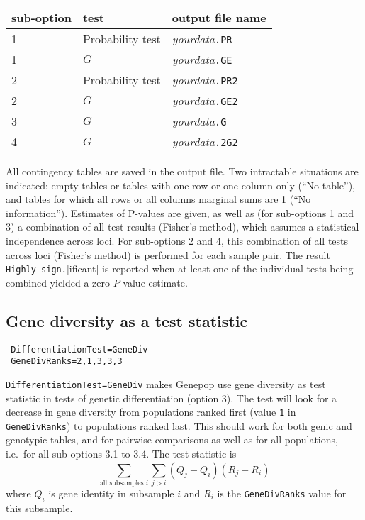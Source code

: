 \documentclass[12pt,]{book}
\begin{document}
\begin{longtable}[]{@{}lll@{}}
\toprule
sub-option & test & output file name\tabularnewline
\midrule
\endhead
1 & Probability test & \emph{yourdata}\texttt{.PR}\tabularnewline
1 & \(G\) & \emph{yourdata}\texttt{.GE}\tabularnewline
2 & Probability test & \emph{yourdata}\texttt{.PR2}\tabularnewline
2 & \(G\) & \emph{yourdata}\texttt{.GE2}\tabularnewline
3 & \(G\) & \emph{yourdata}\texttt{.G}\tabularnewline
4 & \(G\) & \emph{yourdata}\texttt{.2G2}\tabularnewline
\bottomrule
\end{longtable}

All contingency tables are saved in the output file. Two intractable
situations are indicated: empty tables or tables with one row or one
column only (``No table''), and tables for which all rows or all columns
marginal sums are 1 (``No information''). Estimates of P-values are
given, as well as (for sub-options 1 and 3) a combination of all test
results (Fisher's method), which assumes a statistical independence
across loci. For sub-options 2 and 4, this combination of all tests
across loci (Fisher's method) is performed for each sample pair. The
result \texttt{Highly\ sign.}{[}ificant{]} is reported when at least one
of the individual tests being combined yielded a zero \(P\)-value
estimate.

\subsection{Gene diversity as a test
statistic}\label{gene-diversity-as-a-test-statistic}


\begin{verbatim}
 DifferentiationTest=GeneDiv
 GeneDivRanks=2,1,3,3,3
\end{verbatim}

 
\texttt{DifferentiationTest=GeneDiv} makes Genepop use gene diversity as
test statistic in tests of genetic differentiation (option 3). The test
will look for a decrease in gene diversity from populations ranked first
(value \texttt{1} in \texttt{GeneDivRanks}) to populations ranked last.
This should work for both genic and genotypic tables, and for pairwise
comparisons as well as for all populations, i.e.~for all sub-options 3.1
to 3.4. The test statistic is
\[\sum_{\textrm{all subsamples $i$}}\sum_{j>i} (Q_j-Q_i)(R_j-R_i)\]
where \(Q_i\) is gene identity in subsample \(i\) and \(R_i\) is the
\texttt{GeneDivRanks} value for this subsample.
\end{document}
